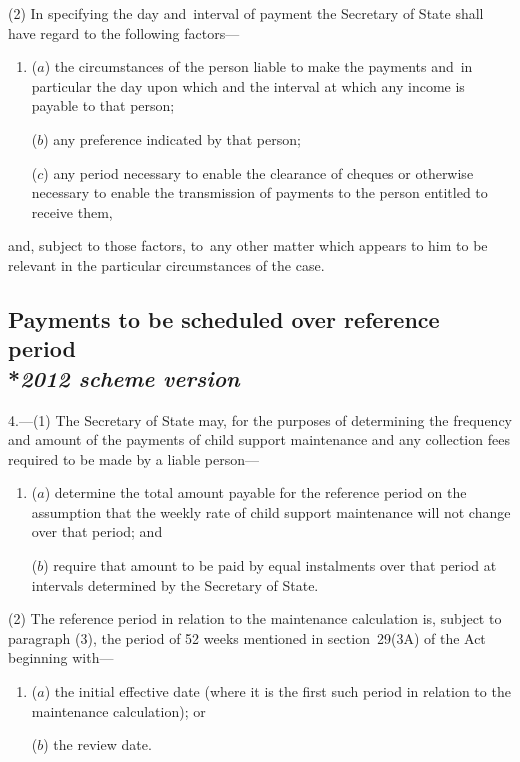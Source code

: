 \documentclass[12pt,a4paper]{article}
\begin{document}
(2) In specifying the day and~interval of payment the Secretary of State shall have regard to the following factors—
\begin{enumerate}\item[]
($a$) the circumstances of the person liable to make the payments and~in particular the day upon which and the interval at which any income is payable to that person;

($b$) any preference indicated by that person;

($c$) any period necessary to enable the clearance of cheques or otherwise necessary to enable the transmission of payments to the person entitled to receive them,
\end{enumerate}
and, subject to those factors, to~any other matter which appears to him to be relevant in the particular circumstances of the case.


\subsection[4. Payments to be scheduled over reference period --- \emph{2012 scheme version}]{Payments to be scheduled over reference period\\*\emph{2012 scheme version}}

4.---(1)  The Secretary of State may, for the purposes of determining the frequency and amount of the payments of child support maintenance 
and any collection fees  %
required to be made by a liable person—
\begin{enumerate}\item[]
($a$) determine the total amount payable for the reference period on the assumption that the weekly rate of child support maintenance will not change over that period; and

($b$) require that amount to be paid by equal instalments over that period at intervals determined by the Secretary of State.
\end{enumerate}

(2) The reference period in relation to the maintenance calculation is, subject to paragraph (3), the period of 52 weeks mentioned in section~29(3A) of the Act beginning with—
\begin{enumerate}\item[]
($a$) the initial effective date (where it is the first such period in relation to the maintenance calculation); or

($b$) the review date.
\end{enumerate}
\end{document}
